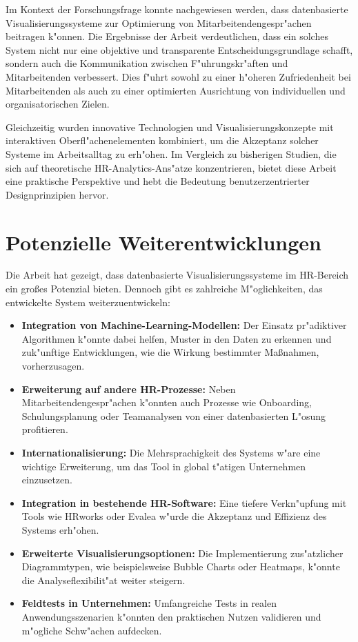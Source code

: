 Im Kontext der Forschungsfrage konnte nachgewiesen werden, dass datenbasierte Visualisierungssysteme zur Optimierung von Mitarbeitendengespr"achen beitragen k"onnen. Die Ergebnisse der Arbeit verdeutlichen, dass ein solches System nicht nur eine objektive und transparente Entscheidungsgrundlage schafft, sondern auch die Kommunikation zwischen F"uhrungskr"aften und Mitarbeitenden verbessert. Dies f"uhrt sowohl zu einer h"oheren Zufriedenheit bei Mitarbeitenden als auch zu einer optimierten Ausrichtung von individuellen und organisatorischen Zielen. 

Gleichzeitig wurden innovative Technologien und Visualisierungskonzepte mit interaktiven Oberfl"achenelementen kombiniert, um die Akzeptanz solcher Systeme im Arbeitsalltag zu erh"ohen. Im Vergleich zu bisherigen Studien, die sich auf theoretische HR-Analytics-Ans"atze konzentrieren, bietet diese Arbeit eine praktische Perspektive und hebt die Bedeutung benutzerzentrierter Designprinzipien hervor.

\section{Potenzielle Weiterentwicklungen}
Die Arbeit hat gezeigt, dass datenbasierte Visualisierungssysteme im HR-Bereich ein gro\ss es Potenzial bieten. Dennoch gibt es zahlreiche M"oglichkeiten, das entwickelte System weiterzuentwickeln:
\begin{itemize}
    \item \textbf{Integration von Machine-Learning-Modellen:} Der Einsatz pr"adiktiver Algorithmen k"onnte dabei helfen, Muster in den Daten zu erkennen und zuk"unftige Entwicklungen, wie die Wirkung bestimmter Ma\ss nahmen, vorherzusagen.
    \item \textbf{Erweiterung auf andere HR-Prozesse:} Neben Mitarbeitendengespr"achen k"onnten auch Prozesse wie Onboarding, Schulungsplanung oder Teamanalysen von einer datenbasierten L"osung profitieren.
    \item \textbf{Internationalisierung:} Die Mehrsprachigkeit des Systems w"are eine wichtige Erweiterung, um das Tool in global t"atigen Unternehmen einzusetzen.
    \item \textbf{Integration in bestehende HR-Software:} Eine tiefere Verkn"upfung mit Tools wie HRworks oder Evalea w"urde die Akzeptanz und Effizienz des Systems erh"ohen.
    \item \textbf{Erweiterte Visualisierungsoptionen:} Die Implementierung zus"atzlicher Diagrammtypen, wie beispielsweise Bubble Charts oder Heatmaps, k"onnte die Analyseflexibilit"at weiter steigern.
    \item \textbf{Feldtests in Unternehmen:} Umfangreiche Tests in realen Anwendungsszenarien k"onnten den praktischen Nutzen validieren und m"ogliche Schw"achen aufdecken.
\end{itemize}


